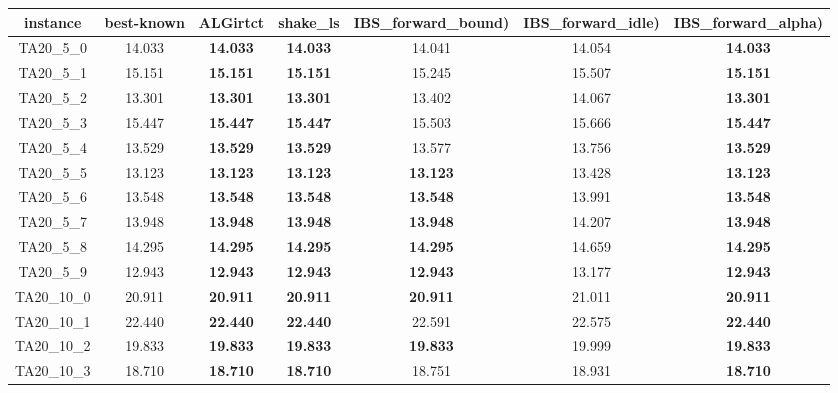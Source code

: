 \begin{tabular}{cc|cc|ccc}
instance & best-known & ALGirtct & shake\_ls & IBS\_forward\_bound) & IBS\_forward\_idle) & IBS\_forward\_alpha) \\ 
 \hline 
TA20\_5\_0         & 14.033           & {\bf 14.033}     & {\bf 14.033}     & 14.041           & 14.054           & {\bf 14.033}    \\ 
TA20\_5\_1         & 15.151           & {\bf 15.151}     & {\bf 15.151}     & 15.245           & 15.507           & {\bf 15.151}    \\ 
TA20\_5\_2         & 13.301           & {\bf 13.301}     & {\bf 13.301}     & 13.402           & 14.067           & {\bf 13.301}    \\ 
TA20\_5\_3         & 15.447           & {\bf 15.447}     & {\bf 15.447}     & 15.503           & 15.666           & {\bf 15.447}    \\ 
TA20\_5\_4         & 13.529           & {\bf 13.529}     & {\bf 13.529}     & 13.577           & 13.756           & {\bf 13.529}    \\ 
TA20\_5\_5         & 13.123           & {\bf 13.123}     & {\bf 13.123}     & {\bf 13.123}     & 13.428           & {\bf 13.123}    \\ 
TA20\_5\_6         & 13.548           & {\bf 13.548}     & {\bf 13.548}     & {\bf 13.548}     & 13.991           & {\bf 13.548}    \\ 
TA20\_5\_7         & 13.948           & {\bf 13.948}     & {\bf 13.948}     & {\bf 13.948}     & 14.207           & {\bf 13.948}    \\ 
TA20\_5\_8         & 14.295           & {\bf 14.295}     & {\bf 14.295}     & {\bf 14.295}     & 14.659           & {\bf 14.295}    \\ 
TA20\_5\_9         & 12.943           & {\bf 12.943}     & {\bf 12.943}     & {\bf 12.943}     & 13.177           & {\bf 12.943}    \\ 
TA20\_10\_0        & 20.911           & {\bf 20.911}     & {\bf 20.911}     & {\bf 20.911}     & 21.011           & {\bf 20.911}    \\ 
TA20\_10\_1        & 22.440           & {\bf 22.440}     & {\bf 22.440}     & 22.591           & 22.575           & {\bf 22.440}    \\ 
TA20\_10\_2        & 19.833           & {\bf 19.833}     & {\bf 19.833}     & {\bf 19.833}     & 19.999           & {\bf 19.833}    \\ 
TA20\_10\_3        & 18.710           & {\bf 18.710}     & {\bf 18.710}     & 18.751           & 18.931           & {\bf 18.710}    \\ 

\end{tabular}
